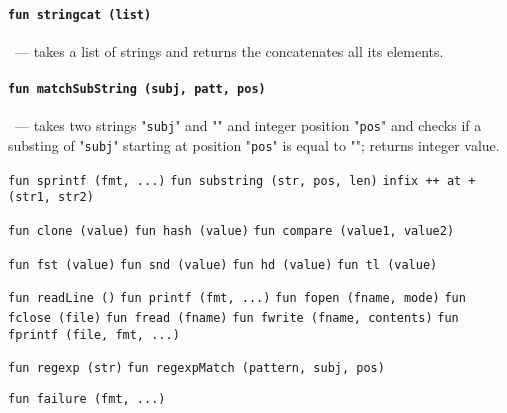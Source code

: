 \paragraph{\lstinline|fun stringcat (list)|}~--- takes a list of strings and returns the concatenates all its elements.

\paragraph{\lstinline|fun matchSubString (subj, patt, pos)|}~--- takes two strings "\texttt{subj}" and "" and integer position "\texttt{pos}" and
checks if a substing of "\texttt{subj}" starting at position "\texttt{pos}" is equal to ""; returns integer value.

\lstinline|fun sprintf (fmt, ...)|
\lstinline|fun substring (str, pos, len)|
\lstinline|infix ++ at + (str1, str2)|

\lstinline|fun clone (value)|
\lstinline|fun hash (value)|
\lstinline|fun compare (value1, value2)|

\lstinline|fun fst (value)|
\lstinline|fun snd (value)|
\lstinline|fun hd (value)|
\lstinline|fun tl (value)|

\lstinline|fun readLine ()|
\lstinline|fun printf (fmt, ...)|
\lstinline|fun fopen (fname, mode)|
\lstinline|fun fclose (file)|
\lstinline|fun fread (fname)|
\lstinline|fun fwrite (fname, contents)|
\lstinline|fun fprintf (file, fmt, ...)|

\lstinline|fun regexp (str)|
\lstinline|fun regexpMatch (pattern, subj, pos)|

\lstinline|fun failure (fmt, ...)|


